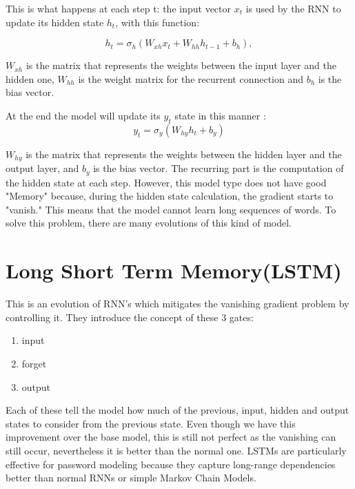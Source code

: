 \documentclass[english,noexaminfo,a4paper,oneside, binding = 0.6cm]{sapthesis}
\begin{document}
This is what happens at each step t:
the input vector $x_t$ is used by the RNN to update its hidden state $h_t$,
with this function\cite{ref:rnnlstm}:

\begin{equation}
    h_t = \sigma_h(W_{xh}x_t+W_{hh}h_{t-1}+b_h),
\end{equation}

$W_{xh}$ is the matrix that represents the weights between the input layer and the hidden one\cite{ref:rnnlstm}, $W_{hh}$ is the weight matrix for the recurrent connection and $b_h$ is the bias vector.

At the end the model will update its $y_t$ state in this manner \cite{ref:rnnlstm}:
\begin{equation}
    y_t = \sigma_y(W_{hy}h_t + b_y)
\end{equation}

$W_{hy}$ is the matrix that represents the weights between the hidden layer and the output layer\cite{ref:rnnlstm}, and $b_y$ is the bias vector.
The recurring part is the computation of the hidden state at each step. However, this model type does not have good "Memory" because, during the hidden state calculation, the gradient starts to "vanish." This means that the model cannot learn long sequences of words. To solve this problem, there are many evolutions of this kind of model.
\section{Long Short Term Memory(LSTM)}
This  is an evolution of RNN's which mitigates the vanishing gradient problem by controlling it. They introduce the concept of  these 3 gates:

\begin{enumerate}
    \item input
    \item forget
    \item output
\end{enumerate}

Each of these tell the model how much of the previous, input, hidden and output states to consider from the previous state.
Even though we have this improvement over the base model, this is still not perfect as the vanishing can still occur, nevertheless it is better than the normal one\cite{ref:rnnlstm}.
LSTMs are particularly effective for password modeling  because they capture long-range dependencies better than normal RNNs or simple Markov Chain Models.
\end{document}

